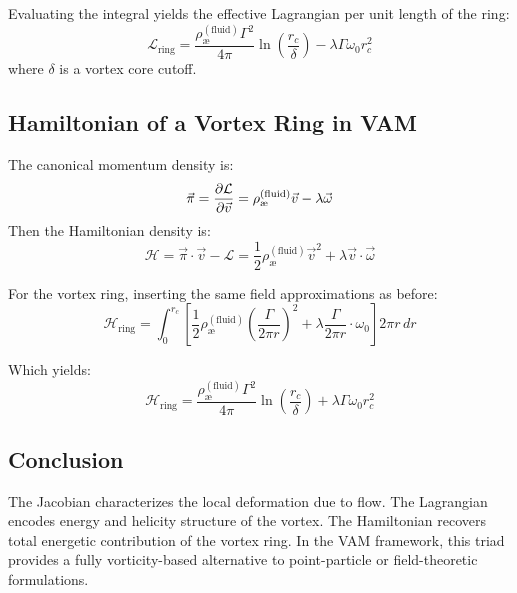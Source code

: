     Evaluating the integral yields the effective Lagrangian per unit length of the ring:
    \begin{equation}
        \mathcal{L}_\text{ring} = \frac{\rho_\text{\ae}^{(\text{fluid})} \Gamma^2}{4\pi} \ln\left( \frac{r_c}{\delta} \right) - \lambda \Gamma \omega_0 r_c^2
    \end{equation}
    where $\delta$ is a vortex core cutoff.

    \subsection{Hamiltonian of a Vortex Ring in VAM}
    The canonical momentum density is:
    \begin{equation}
        \vec{\pi} = \pdv{\mathcal{L}}{\vec{v}} = \rho_\text{\ae}^{(\text{fluid})} \vec{v} - \lambda \vec{\omega}
    \end{equation}
    Then the Hamiltonian density is:
    \begin{equation}
        \mathcal{H} = \vec{\pi} \cdot \vec{v} - \mathcal{L} = \frac{1}{2} \rho_\text{\ae}^{(\text{fluid})} \vec{v}^2 + \lambda \vec{v} \cdot \vec{\omega}
    \end{equation}

    For the vortex ring, inserting the same field approximations as before:
    \begin{equation}
        \mathcal{H}_\text{ring} = \int_0^{r_c} \left[ \frac{1}{2} \rho_\text{\ae}^{(\text{fluid})} \left( \frac{\Gamma}{2\pi r} \right)^2 + \lambda \frac{\Gamma}{2\pi r} \cdot \omega_0 \right] 2\pi r \, dr
    \end{equation}

    Which yields:
    \begin{equation}
        \mathcal{H}_\text{ring} = \frac{\rho_\text{\ae}^{(\text{fluid})} \Gamma^2}{4\pi} \ln\left( \frac{r_c}{\delta} \right) + \lambda \Gamma \omega_0 r_c^2
    \end{equation}

    \subsection{Conclusion}
    The Jacobian characterizes the local deformation due to flow. The Lagrangian encodes energy and helicity structure of the vortex. The Hamiltonian recovers total energetic contribution of the vortex ring. In the VAM framework, this triad provides a fully vorticity-based alternative to point-particle or field-theoretic formulations.